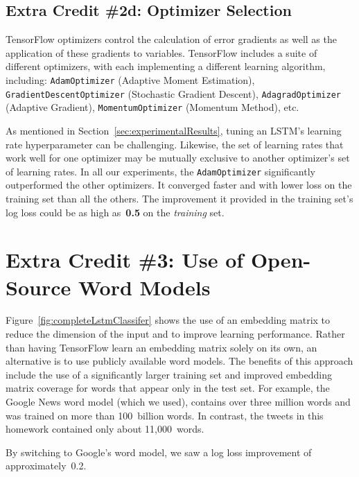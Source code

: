 \documentclass{report}
\begin{document}
     
  \subsection{Extra Credit \#2d: Optimizer Selection}
  
  TensorFlow optimizers control the calculation of error gradients as well as the application of these gradients to variables.  TensorFlow includes a suite of different optimizers, with each implementing a different learning algorithm, including: \texttt{AdamOptimizer} (Adaptive Moment Estimation), \texttt{GradientDescentOptimizer} (Stochastic Gradient Descent), \texttt{AdagradOptimizer} (Adaptive Gradient), \texttt{MomentumOptimizer} (Momentum Method), etc.  
  
  As mentioned in Section~\ref{sec:experimentalResults}, tuning an LSTM's learning rate hyperparameter can be challenging.  Likewise, the set of learning rates that work well for one optimizer may be mutually exclusive to another optimizer's set of learning rates.  In all our experiments, the \texttt{AdamOptimizer} significantly outperformed the other optimizers.  It converged faster and with lower loss on the training set than all the others.  The improvement it provided in the training set's log loss could be as high as~\textbf{0.5} on the \textit{training} set.  
  
  \section{Extra Credit \#3: Use of Open-Source Word Models}\label{sec:openSourceWordModels}
  
  Figure~\ref{fig:completeLstmClassifer} shows the use of an embedding matrix to reduce the dimension of the input and to improve learning performance.  Rather than having TensorFlow learn an embedding matrix solely on its own, an alternative is to use publicly available word models.  The benefits of this approach include the use of a significantly larger training set and improved embedding matrix coverage for words that appear only in the test set.  For example, the Google News word model (which we used), contains over three million words and was trained on more than 100~billion words.  In contrast, the tweets in this homework contained only about 11,000~words.
  
  By switching to Google's word model, we saw a log loss improvement of approximately~0.2.
\end{document}
